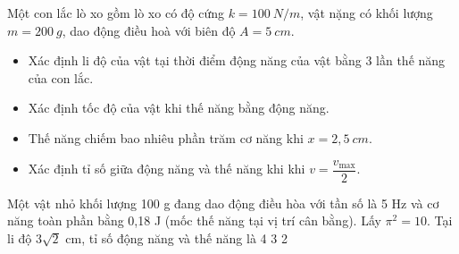 \begin{vidu}
Một con lắc lò xo gồm lò xo có độ cứng $k=100\ N/m$, vật nặng có khối lượng $m=200\ g$, dao động điều hoà với biên độ $A=5\ cm$.
\begin{itemize}
\item[1.] Xác định li độ của vật tại thời điểm động năng của vật bằng 3 lần thế năng của con lắc. 
\item[2.] Xác định tốc độ của vật khi thế năng bằng động năng.
\item[3.] Thế năng chiếm bao nhiêu phần trăm cơ năng khi $x=2,5\ cm$.
\item[4.] Xác định tỉ số giữa động năng và thế năng khi khi $v=\dfrac{v_{\max}}{2}$.
\end{itemize}
\end{vidu} %
\begin{vidu} %
Một vật nhỏ khối lượng 100 g đang dao động điều hòa với tần số là 5 Hz và cơ năng toàn phần bằng 0,18 J (mốc thế năng tại vị trí cân bằng). Lấy $\pi^2 = 10$. Tại li độ $3\sqrt{2}$ cm, tỉ số động năng và thế năng là
\choice
{}
{4}
{3}
{2}
\end{vidu} %
